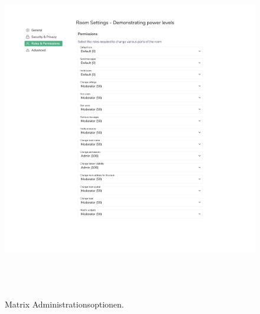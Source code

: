 \begin{figure}[htb]
    \centering
    \includegraphics[height=15cm]{graphics/moderation3.png}
    \caption[Matrix Administrationsoptionen]{Matrix Administrationsoptionen.}
    \label{abb:UI}
\end{figure}
